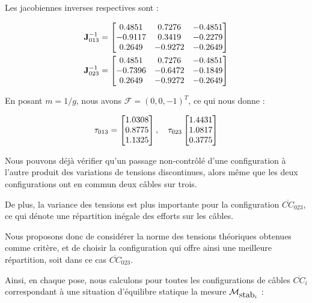 Les jacobiennes inverses respectives sont :

\begin{equation}
\begin{split}
{\bf J}^{-1}_{013} = 
\begin{bmatrix}
0.4851 & 0.7276 & -0.4851 \\
-0.9117 & 0.3419 & -0.2279 \\
0.2649 & -0.9272 & -0.2649
\end{bmatrix}\\
{\bf J}^{-1}_{023} = 
\begin{bmatrix}
0.4851 & 0.7276 & -0.4851 \\
-0.7396 & -0.6472 & -0.1849 \\
0.2649 & -0.9272 & -0.2649
\end{bmatrix}
\end{split}
\label{chap01:eq05}
\end{equation}

En posant $m = 1/g$, nous avons \boldmath ${\mathcal F} = (0, 0, -1)^T$, ce 
qui nous donne :

\begin{equation}
{\bf \tau}_{013} = 
\begin{bmatrix}
1.0308 \\
0.8775 \\
1.1325
\end{bmatrix},
\quad
{\bf \tau}_{023}
\begin{bmatrix}
1.4431 \\
1.0817 \\
0.3775
\end{bmatrix}
\label{chap01:eq06}
\end{equation}

Nous pouvons d\'ej\`a v\'erifier qu'un passage non-contr\^ol\'e d'une 
configuration \`a l'autre produit des variations de tensions discontinues, 
alors m\^eme que les deux configurations ont en commun deux c\^ables sur trois.

De plus, la variance des tensions est plus importante pour la 
configuration $\overline{CC}_{023}$, ce qui dénote une répartition in\'egale 
des efforts sur les câbles.

Nous proposons donc de consid\'erer la norme des tensions th\'eoriques 
obtenues comme critère, et de choisir la configuration qui offre ainsi une meilleure 
r\'epartition, soit dans ce cas $\overline{CC}_{023}$.

Ainsi, en chaque pose, nous calculons pour toutes les configurations de câbles 
$\overline{CC}_i$ correspondant à une situation d'équilibre statique la mesure 
$\mathcal M_{\hbox{stab}_i}$ :

